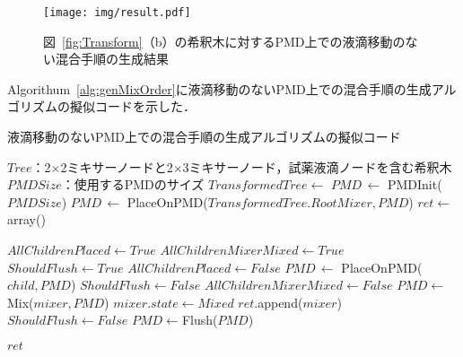 \begin{figure}[tbp]
 \centering\texttt{[image: img/result.pdf]}
    \caption{図~\ref{fig:Transform}（b）の希釈木に対するPMD上での液滴移動のない混合手順の生成結果}\label{fig:result}
\end{figure}

Algorithum~\ref{alg:genMixOrder}に液滴移動のないPMD上での混合手順の生成アルゴリズムの擬似コードを示した．
\begin{algorithm}[tbp]
 \caption{液滴移動のないPMD上での混合手順の生成アルゴリズムの擬似コード}\label{alg:genMixOrder}
 \begin{algorithmic}[1]
     \Require $\mathit{Tree}$：2$\times$2ミキサーノードと2$\times$3ミキサーノード，試薬液滴ノードを含む希釈木 
     \Require $\mathit{PMDSize}$：使用するPMDのサイズ
     \State $\mathit{TransformedTree} \gets$  
     \State $\mathit{PMD}\,\gets $  PMDInit($\mathit{PMDSize}$)
     \State $\mathit{PMD}\,\gets $  PlaceOnPMD($\mathit{TransformedTree.RootMixer,PMD}$)
     \State $\mathit{ret} \gets $array() 

    \State {}
        \State $\mathit{AllChildrenPlaced}\gets\mathit{True}$
        \State $\mathit{AllChildrenMixerMixed}\gets\mathit{True}$
        \State $\mathit{ShouldFlush}\gets\mathit{True}$
                \State$\mathit{AllChildrenPlaced \gets False}$
                \State $\mathit{PMD}\, \gets$  PlaceOnPMD($\mathit{child,PMD}$) 
                \State $\mathit{ShouldFlush}\gets\mathit{False}$
            \EndIf 
                \State $\mathit{AllChildrenMixerMixed}\gets\mathit{False}$
            \EndIf 
        \EndFor 
            \State$\mathit{PMD}\gets$Mix($\mathit{mixer,PMD}$)
            \State$\mathit{mixer.state} \gets \mathit{Mixed}$ 
            \State$\mathit{ret} $.append($\mathit{mixer}$) 
            \State $\mathit{ShouldFlush}\gets\mathit{False}$
        \EndIf
        \EndFor 
{}
                    \State $\mathit{PMD}\gets$Flush($\mathit{PMD}$)
                \EndIf
    \EndWhile 

     \Return $\mathit{ret}$
     \EndFunction
 \end{algorithmic}
\end{algorithm}

